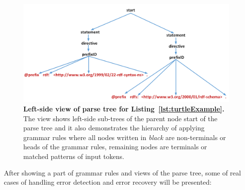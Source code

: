 \begin{figure}
		\centering\includegraphics[width=1\linewidth]{images/implementationParseTreeLeft.png}
		\caption{\textbf{Left-side view of parse tree for Listing~\ref{lst:turtleExample}.} The view shows left-side sub-trees of the parent node start of the parse tree and it also demonstrates the hierarchy of applying grammar rules where all nodes written in \emph{black} are non-terminals or heads of the grammar rules, remaining nodes are terminals or matched patterns of input tokens.}
	\label{Fig:implementationParseTreeLeft}
\end{figure}



After showing a part of grammar rules and views of the parse tree, some of real cases of handling error detection and error recovery will be presented:

